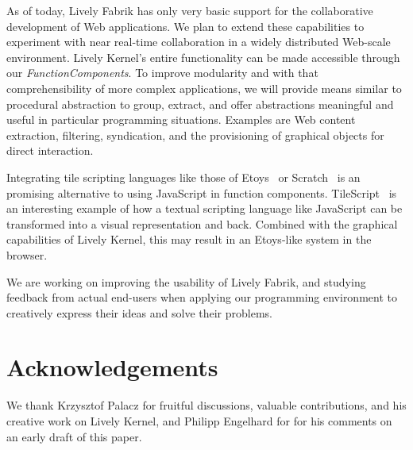 \documentclass[pdftex, times, 10pt, twocolumn]{article}
\begin{document}
As of today, Lively Fabrik has only very basic support for the collaborative development of Web applications. We plan to extend these capabilities to experiment with near real-time collaboration in a widely distributed Web-scale environment. Lively Kernel's entire functionality can be made accessible through our {\em FunctionComponents}. To improve modularity and with that comprehensibility of more complex applications, we will provide means similar to procedural abstraction to group, extract, and offer abstractions meaningful and useful in particular programming situations. Examples are Web content extraction, filtering, syndication, and the provisioning of graphical objects for direct interaction. 

Integrating tile scripting languages like those of Etoys~\cite{Kay2005SEA} or Scratch~\cite{Maloney2004SSP} is an promising alternative to using JavaScript in function components. TileScript~\cite{Warth2008TMS} is an interesting example of how a textual scripting language like JavaScript can be transformed into a visual representation and back. Combined with the graphical capabilities of Lively Kernel, this may result in an Etoys-like system in the browser. 

We are working on improving the usability of Lively Fabrik, and studying feedback from actual end-users when applying our programming environment to creatively express their ideas and solve their problems. 



\section{Acknowledgements}
We thank Krzysztof Palacz for fruitful discussions, valuable contributions, and his creative work on Lively Kernel, and Philipp Engelhard for for his comments on an early draft of this paper.  

 



 
\end{document}
